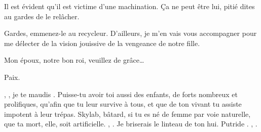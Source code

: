 \begin{drama}
  \reinespeaks Il est évident qu’il est victime d’une machination. Ça ne peut être lui, pitié dites au gardes de le relâcher.

  \roispeaks Gardes, emmenez-le au recycleur. D’ailleurs, je m’en vais vous accompagner pour me délecter de la vision jouissive de la vengeance de notre fille.

  \reinespeaks {} Mon époux, notre bon roi, veuillez de grâce…

  \roispeaks {} Paix.



  \reinespeaks {} \elena, \elena, je te maudis \elena. Puisse-tu avoir toi aussi des enfants, de forts nombreux et prolifiques, qu’afin que tu leur survive à tous, et que de ton vivant tu assiste impotent à leur trépas. \elena Skylab, bâtard, si tu es né de femme par voie naturelle, que ta mort, elle, soit artificielle. \elena, \elena. Je briserais le linteau de ton hui. Putride \elena. \elena, \elena {}.

\end{drama}

